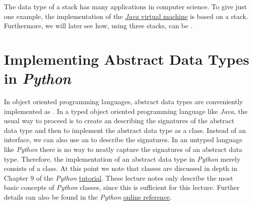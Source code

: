 The data type of a stack has many applications in computer science.  To give just one example, the
implementation of the \href{https://en.wikipedia.org/wiki/Java_virtual_machine}{\textsl{Java} virtual machine}
is based on a stack.  Furthermore,  we will later see how,  using three stacks,  can be
. 


\section[Implementation]{Implementing Abstract Data Types in \textsl{Python}}
In object oriented programming languages, abstract data types are conveniently implemented as
.  In a typed object oriented programming language like \textsl{Java}, the usual way to proceed
is to create an  describing the signatures of the abstract data type and then to implement
the abstract data type as a class.  Instead of an interface, we can also use an 
to describe the signatures.  In an untyped language like \textsl{Python} there is no way to
neatly capture the signatures of an abstract data type.  Therefore, the implementation of an abstract data type in
\textsl{Python} merely consists of a class.  At this point we note that classes are discussed in depth in
Chapter 9 of the \textsl{Python}  \href{https://docs.python.org/3.6/tutorial/classes.html}{tutorial}.  These
lecture notes only describe the most basic concepts of \textsl{Python} classes, since this is sufficient for this
lecture.  Further details can also be found in the \textsl{Python}
\href{https://docs.python.org/3.6/reference/index.html}{online reference}. 



